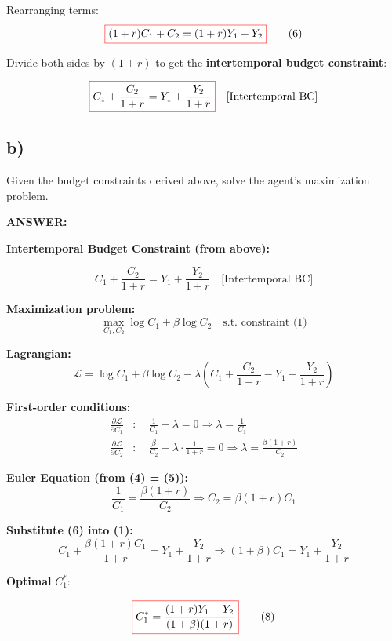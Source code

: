 \documentclass[12pt]{article}
\begin{document}
Rearranging terms:
\[
\fcolorbox{red}{white}{$
(1 + r)C_1 + C_2 = (1 + r)Y_1 + Y_2
$} \tag{6}
\]


Divide both sides by \( (1 + r) \) to get the \textbf{intertemporal budget constraint}:

\[
\fcolorbox{red}{white}{$
\displaystyle
C_1 + \frac{C_2}{1 + r} = Y_1 + \frac{Y_2}{1 + r}
$} \quad \text{[Intertemporal BC]}
\]

\subsection*{\noindent\textbf{b)}}

Given the budget constraints derived above, solve the agent’s maximization problem.

\vspace{0.5em}
\noindent\textcolor{formalred}{\textbf{ANSWER:}}

\textbf{Intertemporal Budget Constraint (from above):}

\[
C_1 + \frac{C_2}{1 + r} = Y_1 + \frac{Y_2}{1 + r} \quad \text{[Intertemporal BC]} \tag{1}
\]


\textbf{Maximization problem:}
\[
\max_{C_1, C_2} \log C_1 + \beta \log C_2 \quad \text{s.t. constraint (1)} \tag{2}
\]

\textbf{Lagrangian:}
\[
\mathcal{L} = \log C_1 + \beta \log C_2 - \lambda \left( C_1 + \frac{C_2}{1 + r} - Y_1 - \frac{Y_2}{1 + r} \right) \tag{3}
\]

\textbf{First-order conditions:}
\begin{align*}
\frac{\partial \mathcal{L}}{\partial C_1} &: \quad \frac{1}{C_1} - \lambda = 0 \Rightarrow \lambda = \frac{1}{C_1} \tag{4} \\
\frac{\partial \mathcal{L}}{\partial C_2} &: \quad \frac{\beta}{C_2} - \lambda \cdot \frac{1}{1 + r} = 0 \Rightarrow \lambda = \frac{\beta(1 + r)}{C_2} \tag{5}
\end{align*}

\textbf{Euler Equation (from (4) = (5)):}
\[
\frac{1}{C_1} = \frac{\beta(1 + r)}{C_2} \Rightarrow C_2 = \beta(1 + r)C_1 \tag{6}
\]

\textbf{Substitute (6) into (1):}
\[
C_1 + \frac{\beta(1 + r)C_1}{1 + r} = Y_1 + \frac{Y_2}{1 + r} \Rightarrow (1 + \beta)C_1 = Y_1 + \frac{Y_2}{1 + r} \tag{7}
\]

\vspace{0.5em}
\textbf{Optimal } \( C_1^* \):

\[
\fcolorbox{red}{white}{$
\displaystyle
C_1^* = \dfrac{(1 + r)Y_1 + Y_2}{(1 + \beta)(1 + r)}
$} \tag{8}
\]
\end{document}
